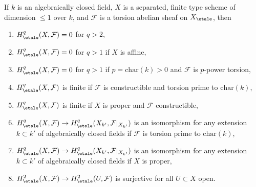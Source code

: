 \begin{theorem}
\label{theorem-vanishing-affine-curves}
If $k$ is an algebraically closed field, $X$ is a separated, finite type
scheme of dimension $\leq 1$ over $k$, and $\mathcal{F}$ is a torsion
abelian sheaf on $X_\etale$, then
\begin{enumerate}
\item
$H^q_\etale(X, \mathcal{F}) = 0$ for $q > 2$,
\item
$H^q_\etale(X, \mathcal{F}) = 0$ for $q > 1$ if $X$ is affine,
\item
$H^q_\etale(X, \mathcal{F}) = 0$ for $q > 1$ if $p = \text{char}(k) > 0$
and $\mathcal{F}$ is $p$-power torsion,
\item
$H^q_\etale(X, \mathcal{F})$ is finite if $\mathcal{F}$ is
constructible and torsion prime to $\text{char}(k)$,
\item
$H^q_\etale(X, \mathcal{F})$ is finite if $X$ is proper and
$\mathcal{F}$ constructible,
\item
$H^q_\etale(X, \mathcal{F}) \to
H^q_\etale(X_{k'}, \mathcal{F}|_{X_{k'}})$ is an isomorphism
for any extension $k \subset k'$ of algebraically closed fields
if $\mathcal{F}$ is torsion prime to $\text{char}(k)$,
\item
$H^q_\etale(X, \mathcal{F}) \to
H^q_\etale(X_{k'}, \mathcal{F}|_{X_{k'}})$ is an isomorphism
for any extension $k \subset k'$ of algebraically closed fields
if $X$ is proper,
\item
$H^2_\etale(X, \mathcal{F}) \to H^2_\etale(U, \mathcal{F})$
is surjective for all $U \subset X$ open.
\end{enumerate}
\end{theorem}

